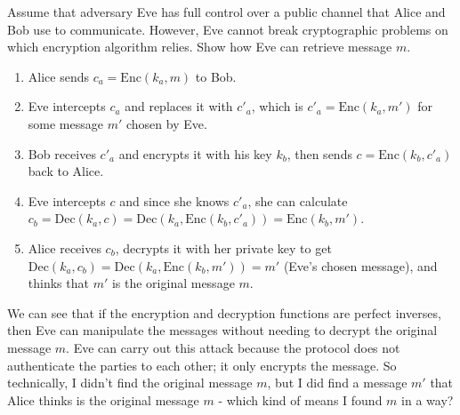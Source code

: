 \documentclass{article}
\begin{document}
Assume that adversary Eve has full control over a public channel that Alice and Bob use to communicate.
However, Eve cannot break cryptographic problems on which encryption algorithm relies. Show how Eve can retrieve message $m$.

\begin{enumerate}
    \item Alice sends \( c_a = \text{Enc}(k_a, m) \) to Bob.
    \item Eve intercepts \( c_a \) and replaces it with \( c'_a \), which is \( c'_a = \text{Enc}(k_a, m') \) for some message \( m' \) chosen by Eve.
    \item Bob receives \( c'_a \) and encrypts it with his key \( k_b \), then sends \( c = \text{Enc}(k_b, c'_a) \) back to Alice.
    \item Eve intercepts \( c \) and since she knows \( c'_a \), she can calculate \( c_b = \text{Dec}(k_a, c) = \text{Dec}(k_a, \text{Enc}(k_b, c'_a)) = \text{Enc}(k_b, m') \).
    \item Alice receives \( c_b \), decrypts it with her private key to get \( \text{Dec}(k_a, c_b) = \text{Dec}(k_a, \text{Enc}(k_b, m')) = m' \) (Eve's chosen message), and thinks that \( m' \) is the original message \( m \).
\end{enumerate}
We can see that if the encryption and decryption functions are perfect inverses, then Eve can manipulate the messages without needing to decrypt the original message \( m \).
Eve can carry out this attack because the protocol does not authenticate the parties to each other; it only encrypts the message.
    So technically, I didn't find the original message \( m \), but I did find a message \( m' \) that Alice thinks is the original message \( m \) - which kind of means I found \( m \) in a way?
\end{document}
